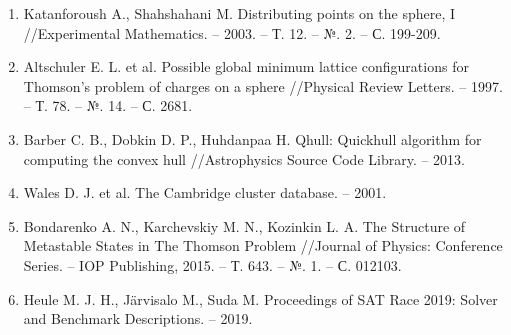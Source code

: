 \begin{enumerate}[leftmargin=0.5cm,topsep=0pt,itemsep=-1ex,partopsep=1ex,parsep=1ex,ref=\arabic{*},label=\arabic{*}.]
\item\label{bib:Katanforoush}
Katanforoush A., Shahshahani M. Distributing points on the sphere, I //Ex\-pe\-ri\-men\-tal Mathematics. – 2003. – Т. 12. – №. 2. – С. 199-209.

\item\label{bib:Altschuler}
Altschuler E. L. et al. Possible global minimum lattice configurations for Thomson's problem of charges on a sphere //Physical Review Letters. – 1997. – Т. 78. – №. 14. – С. 2681.

\item\label{bib:Barber}
Barber C. B., Dobkin D. P., Huhdanpaa H. Qhull: Quickhull algorithm for computing the convex hull //Astrophysics Source Code Library. – 2013.

\item\label{bib:Wales}
Wales D. J. et al. The Cambridge cluster database. – 2001.

\item\label{bib:Bondarenko}
Bondarenko A. N., Karchevskiy M. N., Kozinkin L. A. The Structure of Metastable States in The Thomson Problem //Journal of Physics: Conference Series. – IOP Publishing, 2015. – Т. 643. – №. 1. – С. 012103.

\item\label{bib:HeuleSATRace2019}
Heule M. J. H., Järvisalo M., Suda M. Proceedings of SAT Race 2019: Solver and Benchmark Descriptions. – 2019.

\end{enumerate}

